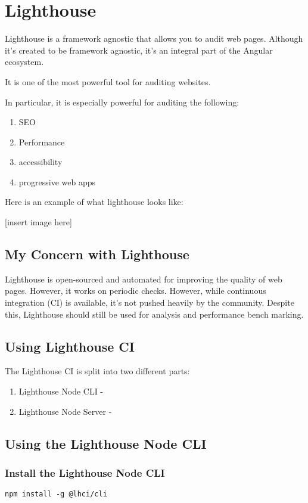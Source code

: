 \chapter{ Lighthouse }    

Lighthouse is a framework agnostic that allows you to audit web pages. Although it's created to be framework agnostic, it's an integral part of the Angular ecosystem.

It is one of the most powerful tool for auditing websites. 

In particular, it is especially powerful for auditing the following:
\begin{enumerate}
  \item SEO 
  \item Performance
  \item accessibility
  \item progressive web apps
\end{enumerate}

Here is an example of what lighthouse looks like:

[insert image here] 

\section{My Concern with Lighthouse}

Lighthouse is open-sourced and automated for improving the quality of web pages. However, it works on periodic checks. However, while continuous integration (CI) is available, it's not pushed heavily by the community. Despite this, Lighthouse should still be used for analysis and performance bench marking. 

\section{Using Lighthouse CI}
The Lighthouse CI is split into two different parts: 
\begin{enumerate}
  \item Lighthouse Node CLI - 
  \item Lighthouse Node Server - 
\end{enumerate}

\section{Using the Lighthouse Node CLI}
\subsection{Install the Lighthouse Node CLI}
\begin{verbatim}
npm install -g @lhci/cli
\end{verbatim}

